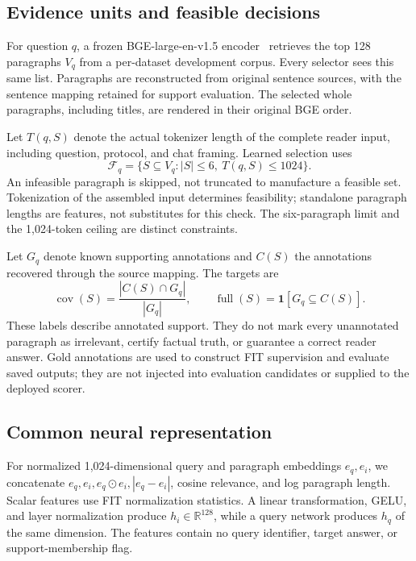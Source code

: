 \documentclass[preprint,12pt]{elsarticle}
\newcommand{\cov}{\operatorname{cov}}
\newcommand{\full}{\operatorname{full}}
\begin{document}
\subsection{Evidence units and feasible decisions}
For question $q$, a frozen BGE-large-en-v1.5 encoder~\cite{xiao2023bge} retrieves the top 128 paragraphs $V_q$ from a per-dataset development corpus. Every selector sees this same list. Paragraphs are reconstructed from original sentence sources, with the sentence mapping retained for support evaluation. The selected whole paragraphs, including titles, are rendered in their original BGE order.

Let $T(q,S)$ denote the actual tokenizer length of the complete reader input, including question, protocol, and chat framing. Learned selection uses
\begin{equation}\label{eq:feas}
\mathcal F_q=\{S\subseteq V_q:|S|\leq6,\ T(q,S)\leq1024\}.
\end{equation}
An infeasible paragraph is skipped, not truncated to manufacture a feasible set. Tokenization of the assembled input determines feasibility; standalone paragraph lengths are features, not substitutes for this check. The six-paragraph limit and the 1,024-token ceiling are distinct constraints.

Let $G_q$ denote known supporting annotations and $C(S)$ the annotations recovered through the source mapping. The targets are
\begin{equation}\label{eq:targets}
\cov(S)=\frac{|C(S)\cap G_q|}{|G_q|},\qquad
\full(S)=\mathbf 1[G_q\subseteq C(S)].
\end{equation}
These labels describe annotated support. They do not mark every unannotated paragraph as irrelevant, certify factual truth, or guarantee a correct reader answer. Gold annotations are used to construct FIT supervision and evaluate saved outputs; they are not injected into evaluation candidates or supplied to the deployed scorer.

\subsection{Common neural representation}
For normalized 1,024-dimensional query and paragraph embeddings $e_q,e_i$, we concatenate $e_q,e_i,e_q\odot e_i,|e_q-e_i|$, cosine relevance, and log paragraph length. Scalar features use FIT normalization statistics. A linear transformation, GELU, and layer normalization produce $h_i\in\mathbb R^{128}$, while a query network produces $h_q$ of the same dimension. The features contain no query identifier, target answer, or support-membership flag.
\end{document}
